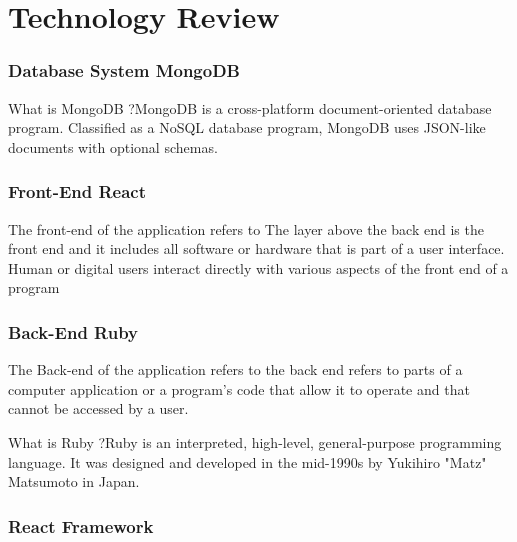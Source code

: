 \chapter{Technology Review}




\subsection{Database System MongoDB}

What is MongoDB ?MongoDB is a cross-platform document-oriented database program. Classified as a NoSQL database program, MongoDB uses JSON-like documents with optional schemas. 



\subsection{Front-End React }

 The front-end of the application refers to  The layer above the back end is the front end and it includes all software or hardware that is part of a user interface. Human or digital users interact directly with various aspects of the front end of a program


\subsection{Back-End Ruby } 
The Back-end of the application  refers to the  back end refers to parts of a computer application or a program's code that allow it to operate and that cannot be accessed by a user. 



What is Ruby ?Ruby is an interpreted, high-level, general-purpose programming language. It was designed and developed in the mid-1990s by Yukihiro "Matz" Matsumoto in Japan.
\subsection{React Framework}



